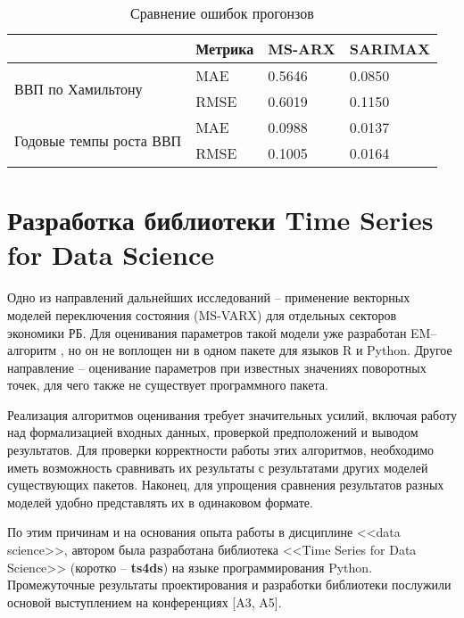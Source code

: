 \documentclass[a4paper,14pt]{extreport}
\begin{document}
	\begin{table}[]
		\centering
		\caption{Сравнение ошибок прогонзов}
		\begin{tabular}{l|l|ll|}
			\cline{2-4}
			& Метрика & MS-ARX & SARIMAX \\ \hline
			\multicolumn{1}{|l|}{\multirow{2}{*}{ВВП по Хамильтону}}       & MAE     & 0.5646 & 0.0850  \\
			\multicolumn{1}{|l|}{}                                         & RMSE    & 0.6019 & 0.1150  \\ \hline
			\multicolumn{1}{|l|}{\multirow{2}{*}{Годовые темпы роста ВВП}} & MAE     & 0.0988 & 0.0137  \\
			\multicolumn{1}{|l|}{}                                         & RMSE    & 0.1005 & 0.0164  \\ \hline
		\end{tabular}
		\label{tbl:errors}
	\end{table}
	
	
	
	
	\chapter{Разработка библиотеки Time Series for Data Science}
	
	Одно из направлений дальнейших исследований -- применение векторных моделей переключения состояния (MS-VARX) для отдельных секторов экономики РБ. Для оценивания параметров такой модели уже разработан EM--алгоритм \cite{malNovopMSVARX}, но он не воплощен ни в одном пакете для языков R и Python. Другое направление -- оценивание параметров при известных значениях поворотных точек, для чего также не существует программного пакета.
	
	Реализация алгоритмов оценивания требует значительных усилий, включая работу над формализацией входных данных, проверкой предположений и выводом результатов. Для проверки корректности работы этих алгоритмов, необходимо иметь возможность сравнивать их результаты с результатами других моделей существующих пакетов. Наконец, для упрощения сравнения результатов разных моделей удобно представлять их в одинаковом формате.
	
	По этим причинам и на основания опыта работы в дисциплине <<data science>>, автором была разработана библиотека <<Time Series for Data Science>> (коротко -- \textbf{ts4ds}) на языке программирования Python. Промежуточные результаты проектирования и разработки библиотеки послужили основой выступлением на конференциях [A3, A5].
	
\end{document}
